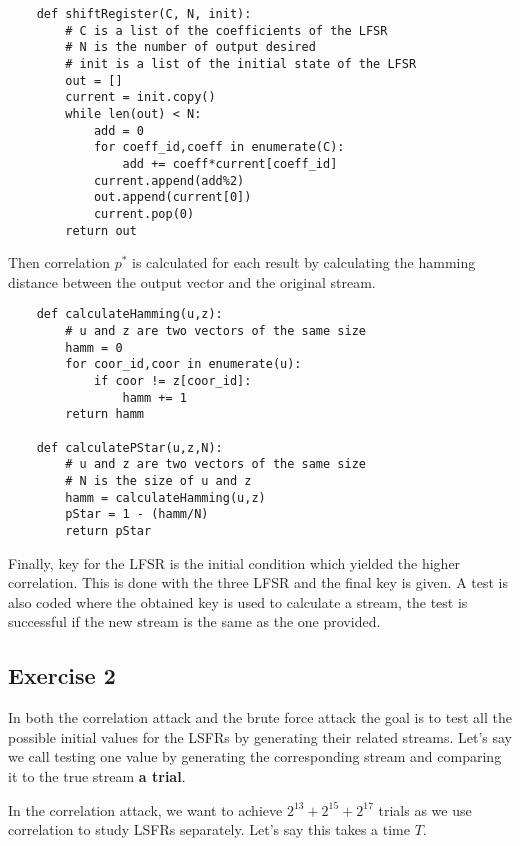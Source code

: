\documentclass{article}
\begin{document}
\begin{verbatim}
    def shiftRegister(C, N, init):
        # C is a list of the coefficients of the LFSR
        # N is the number of output desired
        # init is a list of the initial state of the LFSR
        out = []
        current = init.copy()
        while len(out) < N:
            add = 0
            for coeff_id,coeff in enumerate(C):
                add += coeff*current[coeff_id]
            current.append(add%2)
            out.append(current[0])
            current.pop(0)
        return out
\end{verbatim}

Then correlation $p^*$ is calculated for each result by calculating the hamming distance between the output vector and the original stream.

\begin{verbatim}
    def calculateHamming(u,z):
        # u and z are two vectors of the same size
        hamm = 0
        for coor_id,coor in enumerate(u):
            if coor != z[coor_id]:
                hamm += 1
        return hamm

    def calculatePStar(u,z,N):
        # u and z are two vectors of the same size
        # N is the size of u and z
        hamm = calculateHamming(u,z)
        pStar = 1 - (hamm/N)
        return pStar
\end{verbatim}

Finally, key for the LFSR is the initial condition which yielded the higher correlation. This is done with the three LFSR and the final key is given. A test is also coded where the obtained key is used to calculate a stream, the test is successful if the new stream is the same as the one provided. 

\subsection{Exercise 2}

In both the correlation attack and the brute force attack the goal is to test all the possible initial values for the LSFRs by generating their related streams. Let's say we call testing one value by generating the corresponding stream and comparing it to the true stream \textbf{a trial}. \newline

In the correlation attack, we want to achieve $2^{13}+2^{15}+2^{17}$ trials as we use correlation to study LSFRs separately. Let's say this takes a time $T$.\newline
\end{document}
